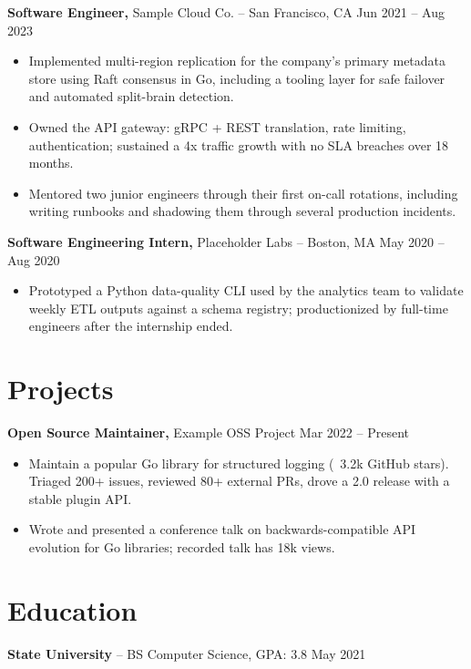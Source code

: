 \documentclass[11pt]{article}
\begin{document}
\textbf{Software Engineer,} Sample Cloud Co. -- San Francisco, CA \hfill Jun 2021 -- Aug 2023 \\
\vspace{-9pt}
\begin{itemize}
  \item Implemented multi-region replication for the company's primary metadata store using Raft consensus in Go, including a tooling layer for safe failover and automated split-brain detection.
  \item Owned the API gateway: gRPC + REST translation, rate limiting, authentication; sustained a 4x traffic growth with no SLA breaches over 18 months.
  \item Mentored two junior engineers through their first on-call rotations, including writing runbooks and shadowing them through several production incidents.
\end{itemize}

\textbf{Software Engineering Intern,} Placeholder Labs -- Boston, MA \hfill May 2020 -- Aug 2020 \\
\vspace{-9pt}
\begin{itemize}
  \item Prototyped a Python data-quality CLI used by the analytics team to validate weekly ETL outputs against a schema registry; productionized by full-time engineers after the internship ended.
\end{itemize}

\section*{Projects}

\textbf{Open Source Maintainer,} Example OSS Project \hfill Mar 2022 -- Present \\
\vspace{-9pt}
\begin{itemize}
  \item Maintain a popular Go library for structured logging (~3.2k GitHub stars). Triaged 200+ issues, reviewed 80+ external PRs, drove a 2.0 release with a stable plugin API.
  \item Wrote and presented a conference talk on backwards-compatible API evolution for Go libraries; recorded talk has 18k views.
\end{itemize}

\section*{Education}
\textbf{State University} -- BS Computer Science, GPA: 3.8 \hfill May 2021
\end{document}
